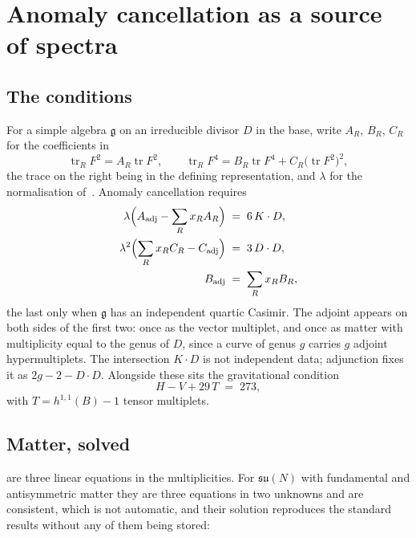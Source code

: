 \documentclass[11pt,a4paper]{article}
\newcommand{\g}[1]{\mathfrak{#1}}
\theoremstyle{definition}
\begin{document}

\section{Anomaly cancellation as a source of spectra}
\label{sec:anomaly}

\subsection{The conditions}

For a simple algebra $\g{g}$ on an irreducible divisor $D$ in the base, write
$A_R$, $B_R$, $C_R$ for the coefficients in
%
\begin{equation}
\operatorname{tr}_R F^2 = A_R \operatorname{tr}F^2 ,
\qquad
\operatorname{tr}_R F^4 = B_R \operatorname{tr}F^4
+ C_R \bigl(\operatorname{tr}F^2\bigr)^2 ,
\label{eq:traces}
\end{equation}
%
the trace on the right being in the defining representation, and $\lambda$ for
the normalisation of~\cite{KumarMorrisonTaylor2010}. Anomaly cancellation
requires
%
\begin{align}
\lambda \Bigl( A_{\mathrm{adj}} - \sum_R x_R A_R \Bigr)
&\;=\; 6\,K \cdot D , \label{eq:condA}\\
\lambda^2 \Bigl( \sum_R x_R C_R - C_{\mathrm{adj}} \Bigr)
&\;=\; 3\,D \cdot D , \label{eq:condC}\\
B_{\mathrm{adj}} &\;=\; \sum_R x_R B_R , \label{eq:condB}
\end{align}
%
the last only when $\g{g}$ has an independent quartic Casimir. The adjoint
appears on both sides of the first two: once as the vector multiplet, and once
as matter with multiplicity equal to the genus of $D$, since a curve of genus
$g$ carries $g$ adjoint hypermultiplets. The intersection $K \cdot D$ is not
independent data; adjunction fixes it as $2g - 2 - D\cdot D$. Alongside these
sits the gravitational condition
%
\begin{equation}
H - V + 29\,T \;=\; 273 ,
\label{eq:grav}
\end{equation}
%
with $T = h^{1,1}(B) - 1$ tensor multiplets.

\subsection{Matter, solved}
\label{sec:matter}

 are three linear equations in the
multiplicities. For $\g{su}(N)$ with fundamental and antisymmetric matter they
are three equations in two unknowns and are consistent, which is not
automatic, and their solution reproduces the standard results without any of
them being stored:
\end{document}
